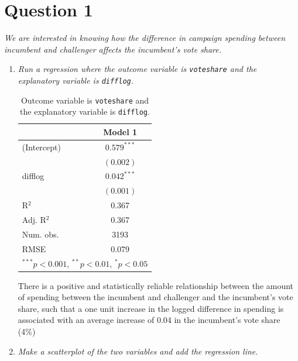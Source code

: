 \documentclass[12pt,letterpaper]{article}
\begin{document}
	\section*{Question 1}%
	\vspace{.25cm}
	\noindent \emph{We are interested in knowing how the difference in campaign spending between incumbent and challenger affects the incumbent's vote share. }
	\begin{enumerate}
		\item \emph{Run a regression where the outcome variable is \texttt{voteshare} and the explanatory variable is \texttt{difflog}.	}\vspace{.25cm}
			  
			\clearpage

\begin{table}
\begin{center}
	\caption{\footnotesize{Outcome variable is \texttt{voteshare} and the explanatory variable is \texttt{difflog}.}} %
	\label{table:coefficients}
\begin{tabular}{l c }
\hline
 & Model 1 \\
\hline
(Intercept) & $0.579^{***}$ \\
            & $(0.002)$     \\
difflog     & $0.042^{***}$ \\
            & $(0.001)$     \\
\hline
R$^2$       & 0.367         \\
Adj. R$^2$  & 0.367         \\
Num. obs.   & 3193          \\
RMSE        & 0.079         \\
\hline
\multicolumn{2}{l}{\scriptsize{$^{***}p<0.001$, $^{**}p<0.01$, $^*p<0.05$}}
\end{tabular}
\end{center}
\end{table}
		
\vspace{-1cm}
\noindent There is a positive and statistically reliable relationship between the amount of spending between the incumbent and challenger and the incumbent's vote share, such that a one unit increase in the logged difference in spending is associated with an average increase of 0.04 in the incumbent's vote share (4\%)	\vspace{.25cm}
		
		\item \emph{Make a scatterplot of the two variables and add the regression line. }	\vspace{.25cm}
		

\end{enumerate}
\end{document}

